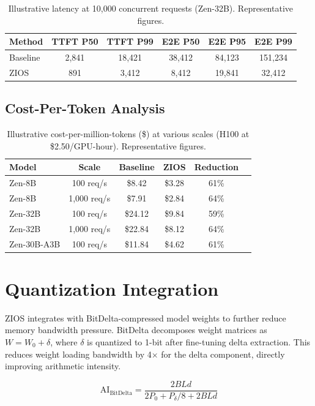\documentclass[11pt,a4paper]{article}
\begin{document}
\begin{table}[H]
\centering
\caption{Illustrative latency at 10,000 concurrent requests (Zen-32B). Representative figures.}
\label{tab:latency_10k}
\begin{tabular}{lccccc}
\toprule
Method & TTFT P50 & TTFT P99 & E2E P50 & E2E P95 & E2E P99 \\
\midrule
Baseline & 2,841 & 18,421 & 38,412 & 84,123 & 151,234 \\
ZIOS & 891 & 3,412 & 8,412 & 19,841 & 32,412 \\
\bottomrule
\end{tabular}
\end{table}

\subsection{Cost-Per-Token Analysis}

\begin{table}[H]
\centering
\caption{Illustrative cost-per-million-tokens (\$) at various scales (H100 at \$2.50/GPU-hour). Representative figures.}
\label{tab:cost}
\begin{tabular}{lccccc}
\toprule
Model & Scale & Baseline & ZIOS & Reduction \\
\midrule
Zen-8B & 100 req/s & \$8.42 & \$3.28 & 61\% \\
Zen-8B & 1,000 req/s & \$7.91 & \$2.84 & 64\% \\
Zen-32B & 100 req/s & \$24.12 & \$9.84 & 59\% \\
Zen-32B & 1,000 req/s & \$22.84 & \$8.12 & 64\% \\
Zen-30B-A3B & 100 req/s & \$11.84 & \$4.62 & 61\% \\
\bottomrule
\end{tabular}
\end{table}

\section{Quantization Integration}

ZIOS integrates with BitDelta-compressed model weights to further reduce memory bandwidth pressure. BitDelta decomposes weight matrices as $W = W_0 + \delta$, where $\delta$ is quantized to 1-bit after fine-tuning delta extraction. This reduces weight loading bandwidth by 4$\times$ for the delta component, directly improving arithmetic intensity.

\begin{equation}
\text{AI}_{\text{BitDelta}} = \frac{2BLd}{2P_0 + P_\delta/8 + 2BLd}
\end{equation}
\end{document}
